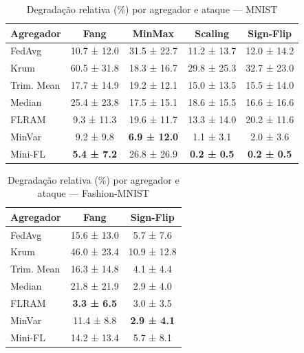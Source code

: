 \begin{table}[H]
\centering
\caption{Degradação relativa (\%) por agregador e ataque — MNIST}
\label{tab:degradacao_mnist}
\footnotesize
\setlength{\tabcolsep}{3pt}
\begin{tabular}{@{}lcccc@{}}
\toprule
\textbf{Agregador} & \textbf{Fang} & \textbf{MinMax} & \textbf{Scaling} & \textbf{Sign-Flip} \\
\midrule
FedAvg & 10.7 ± 12.0 & 31.5 ± 22.7 & 11.2 ± 13.7 & 12.0 ± 14.2 \\
Krum & 60.5 ± 31.8 & 18.3 ± 16.7 & 29.8 ± 25.3 & 32.7 ± 23.0 \\
Trim. Mean & 17.7 ± 14.9 & 19.2 ± 12.1 & 15.0 ± 13.5 & 15.5 ± 14.0 \\
Median & 25.4 ± 23.8 & 17.5 ± 15.1 & 18.6 ± 15.5 & 16.6 ± 16.6 \\
FLRAM & 9.3 ± 11.3 & 19.6 ± 11.7 & 13.3 ± 14.0 & 20.2 ± 11.6 \\
MinVar & 9.2 ± 9.8 & \textbf{6.9 ± 12.0} & 1.1 ± 3.1 & 2.0 ± 3.6 \\
Mini-FL & \textbf{5.4 ± 7.2} & 26.8 ± 26.9 & \textbf{0.2 ± 0.5} & \textbf{0.2 ± 0.5} \\
\bottomrule
\end{tabular}
\end{table}
\begin{table}[H]
\centering
\caption{Degradação relativa (\%) por agregador e ataque — Fashion-MNIST}
\label{tab:degradacao_fashion}
\footnotesize
\setlength{\tabcolsep}{3pt}
\begin{tabular}{@{}lcc@{}}
\toprule
\textbf{Agregador} & \textbf{Fang} & \textbf{Sign-Flip} \\
\midrule
FedAvg & 15.6 ± 13.0 & 5.7 ± 7.6 \\
Krum & 46.0 ± 23.4 & 10.9 ± 12.8 \\
Trim. Mean & 16.3 ± 14.8 & 4.1 ± 4.4 \\
Median & 21.8 ± 21.9 & 2.9 ± 4.0 \\
FLRAM & \textbf{3.3 ± 6.5} & 3.0 ± 3.5 \\
MinVar & 11.4 ± 8.8 & \textbf{2.9 ± 4.1} \\
Mini-FL & 14.2 ± 13.4 & 5.7 ± 8.1 \\
\bottomrule
\end{tabular}
\end{table}
